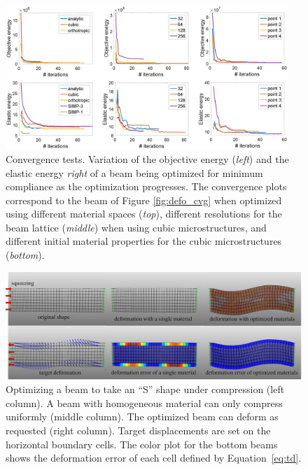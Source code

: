 \begin{figure}[h]
	\centering
	\includegraphics[width=0.95\textwidth]{figs/cvg_test.png}
	\caption{Convergence tests. Variation of the objective energy (\emph{left}) and the elastic energy \emph{right} of a beam being optimized for minimum compliance as the optimization progresses. The convergence plots correspond to the beam of Figure \ref{fig:defo_cvg} when optimized using different material spaces (\emph{top}), different resolutions for the beam lattice (\emph{middle}) when using cubic microstructures, and different initial material properties for the cubic microstructures (\emph{bottom}).}
	\label{plot:cvg}
\end{figure}
\begin{figure}
	\centering
	\includegraphics[width=.95\linewidth]{images/bar_visio_new.png}
	\caption{
		Optimizing a beam to take an ``S'' shape under compression (left column).
		A beam with homogeneous material can only compress uniformly (middle column).
		The optimized beam can deform as requested (right column).
		Target displacements are set on the horizontal boundary cells.
		The color plot for the bottom beams shows the deformation error of each cell defined by Equation~\ref{eq:td}.
		\label{fig:beam_S_shape}}
\end{figure}

